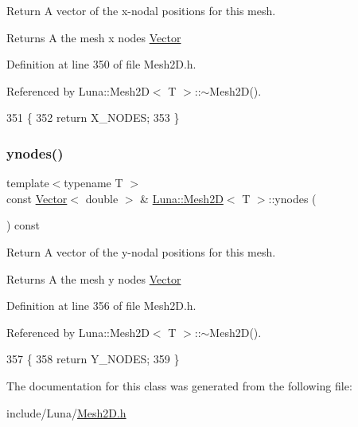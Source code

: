 Return A vector of the x-\/nodal positions for this mesh. 

\begin{DoxyReturn}{Returns}
A the mesh x nodes \hyperlink{classLuna_1_1Vector}{Vector} 
\end{DoxyReturn}


Definition at line 350 of file Mesh2\+D.\+h.



Referenced by Luna\+::\+Mesh2\+D$<$ T $>$\+::$\sim$\+Mesh2\+D().


\begin{DoxyCode}
351   \{
352     \textcolor{keywordflow}{return} X\_NODES;
353   \}
\end{DoxyCode}
\mbox{\label{classLuna_1_1Mesh2D_a7644446cbd5b3f1dc40f1fd8f9137ff3}} 
\subsubsection{\texorpdfstring{ynodes()}{ynodes()}}
{\footnotesize\ttfamily template$<$typename T $>$ \\
const \hyperlink{classLuna_1_1Vector}{Vector}$<$ double $>$ \& \hyperlink{classLuna_1_1Mesh2D}{Luna\+::\+Mesh2D}$<$ T $>$\+::ynodes (\begin{DoxyParamCaption}{ }\end{DoxyParamCaption}) const}



Return A vector of the y-\/nodal positions for this mesh. 

\begin{DoxyReturn}{Returns}
A the mesh y nodes \hyperlink{classLuna_1_1Vector}{Vector} 
\end{DoxyReturn}


Definition at line 356 of file Mesh2\+D.\+h.



Referenced by Luna\+::\+Mesh2\+D$<$ T $>$\+::$\sim$\+Mesh2\+D().


\begin{DoxyCode}
357   \{
358     \textcolor{keywordflow}{return} Y\_NODES;
359   \}
\end{DoxyCode}


The documentation for this class was generated from the following file\+:\begin{DoxyCompactItemize}
\item 
include/\+Luna/\hyperlink{Mesh2D_8h}{Mesh2\+D.\+h}\end{DoxyCompactItemize}
